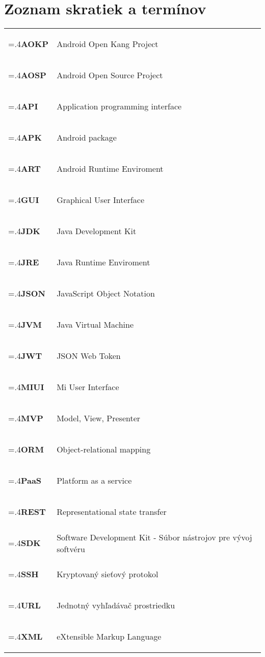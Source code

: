\chapter*{Zoznam skratiek a termínov}

\begin{tabularx}{\textwidth}{@{}>{\bfseries\raggedright\hsize=.4\hsize}X >{\hsize=1.6\hsize}X@{}}
        
        \textbf{AOKP} & Android Open Kang Project \label{AOKP}\\
    \textbf{AOSP} & Android Open Source Project \label{AOSP}\\
    \textbf{API} & Application programming interface \label{api}\\
    \textbf{APK} & Android package \label{apk}\\
    \textbf{ART} & Android Runtime Enviroment  \label{art}\\
    \textbf{GUI} & Graphical User Interface \label{gui}\\
    \textbf{JDK} & Java Development Kit \label{jdk}\\
    \textbf{JRE} & Java Runtime Enviroment  \label{jre}\\
    \textbf{JSON} & JavaScript Object Notation \label{json}\\
    \textbf{JVM} & Java Virtual Machine  \label{jvm}\\
    \textbf{JWT} & JSON Web Token   \label{jwt}\\
    \textbf{MIUI} & Mi User Interface\label{api}\\
    \textbf{MVP} & Model, View, Presenter \label{mvp}\\
    \textbf{ORM} & Object-relational mapping \label{orm}\\
    \textbf{PaaS} & Platform as a service  \label{PaaS}\\
    \textbf{REST} & Representational state transfer  \label{rest}\\
    \textbf{SDK} & Software Development Kit - Súbor nástrojov pre vývoj softvéru \label{sdk}\\
    \textbf{SSH} & Kryptovaný sieťový protokol \label{sdk}\\
    \textbf{URL} & Jednotný vyhľadávač prostriedku \label{sdk}\\
    \textbf{XML} & eXtensible Markup Language \label{xml}\\

 \end{tabularx}